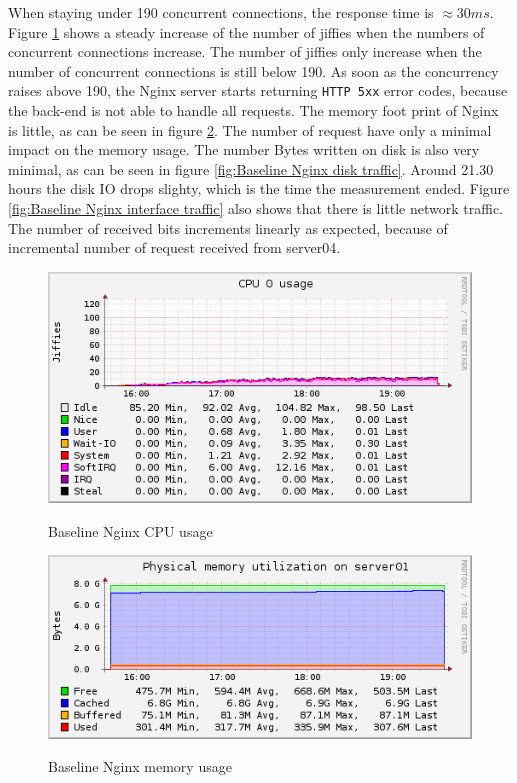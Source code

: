 \documentclass[Measurements]{subfiles}
\begin{document}
When staying under 190 concurrent connections, the response time is \mbox{$\approx 30 ms$}. Figure \ref{fig:Baseline Nginx CPU usage} shows a steady increase of the number of jiffies when the numbers of concurrent connections increase. The number of jiffies only increase when the number of concurrent connections is still below 190. As soon as the concurrency raises above 190, the Nginx server starts returning \verb+HTTP 5xx+ error codes, because the back-end is not able to handle all requests. The memory foot print of Nginx is little, as can be seen in figure \ref{fig:Baseline Nginx memory usage}. The number of request have only a minimal impact on the memory usage. The number Bytes written on disk is also very minimal, as can be seen in figure \ref{fig:Baseline Nginx disk traffic}. Around 21.30 hours the disk IO drops slighty, which is the time the measurement ended. Figure \ref{fig:Baseline Nginx interface traffic} also shows that there is little network traffic. The number of received bits increments linearly as expected, because of incremental number of request received from server04.   

\begin{figure}[H]
\centering
\caption{Baseline Nginx CPU usage}
\includegraphics[scale=0.7]{images/results/baseline/cpu.png}
\label{fig:Baseline Nginx CPU usage}
\end{figure}

\begin{figure}[H]
\centering
\caption{Baseline Nginx memory usage}
\includegraphics[scale=0.7]{images/results/baseline/memory.png}
\label{fig:Baseline Nginx memory usage}
\end{figure}
\end{document}
